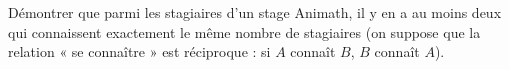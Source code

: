 Démontrer que parmi les stagiaires d'un stage Animath, il y en a au moins deux qui connaissent exactement le même nombre de stagiaires (on suppose que la relation « se connaître » est réciproque : si $A$ connaît $B$, $B$ connaît $A$).
